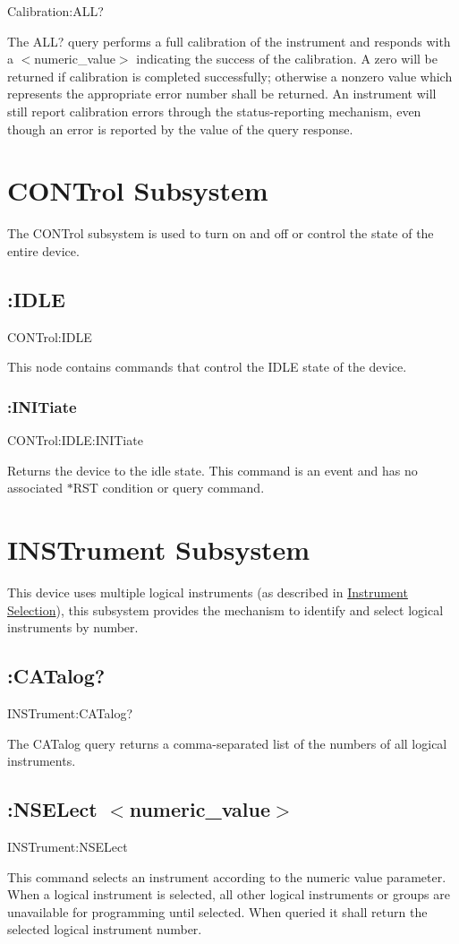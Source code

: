 {\ttfamily Calibration\-:A\-L\-L?}\par
 The A\-L\-L? query performs a full calibration of the instrument and responds with a {\ttfamily $<$}numeric\-\_\-value{\ttfamily $>$} indicating the success of the calibration. A zero will be returned if calibration is completed successfully; otherwise a nonzero value which represents the appropriate error number shall be returned. An instrument will still report calibration errors through the status-\/reporting mechanism, even though an error is reported by the value of the query response.\hypertarget{a00002_ctrl}{}\section{C\-O\-N\-Trol Subsystem}\label{a00002_ctrl}
The C\-O\-N\-Trol subsystem is used to turn on and off or control the state of the entire device.\hypertarget{a00002_ctrlidle}{}\subsection{\-:\-I\-D\-L\-E}\label{a00002_ctrlidle}
{\ttfamily C\-O\-N\-Trol\-:I\-D\-L\-E}\par
 This node contains commands that control the I\-D\-L\-E state of the device.\hypertarget{a00002_ctrlidleinit}{}\subsubsection{\-:\-I\-N\-I\-Tiate}\label{a00002_ctrlidleinit}
{\ttfamily C\-O\-N\-Trol\-:\-I\-D\-L\-E\-:I\-N\-I\-Tiate}\par
 Returns the device to the idle state. This command is an event and has no associated $\ast$\-R\-S\-T condition or query command.\hypertarget{a00002_inst}{}\section{I\-N\-S\-Trument Subsystem}\label{a00002_inst}
This device uses multiple logical instruments (as described in \hyperlink{a00001_device}{Instrument Selection}), this subsystem provides the mechanism to identify and select logical instruments by number.\hypertarget{a00002_instcat}{}\subsection{\-:\-C\-A\-Talog?}\label{a00002_instcat}
{\ttfamily I\-N\-S\-Trument\-:C\-A\-Talog?}\par
 The C\-A\-Talog query returns a comma-\/separated list of the numbers of all logical instruments.\hypertarget{a00002_instnsel}{}\subsection{\-:\-N\-S\-E\-Lect $<$numeric\-\_\-value$>$}\label{a00002_instnsel}
{\ttfamily I\-N\-S\-Trument\-:N\-S\-E\-Lect}\par
 This command selects an instrument according to the numeric value parameter. When a logical instrument is selected, all other logical instruments or groups are unavailable for programming until selected. When queried it shall return the selected logical instrument number.

